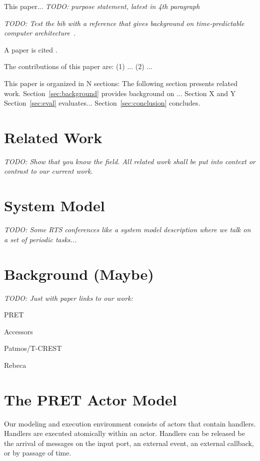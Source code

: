 \documentclass[a4paper, conference]{IEEEtran}
\newcommand{\todo}[1]{{\emph{TODO: #1}}}
\begin{document}
This paper... \todo{purpose statement, latest in 4th paragraph}

\todo{Test the bib with a reference that gives background on time-predictable
computer architecture~\cite{tpca:jes}.}

A paper is cited \cite{paper:example}.

The contributions of this paper are: (1) ... (2) ...

This paper is organized in N sections: The following section presents related work.
Section~\ref{sec:background} provides background on ...
Section X and Y 
Section~\ref{sec:eval} evaluates...
Section~\ref{sec:conclusion} concludes.

\section{Related Work}
\label{sec:related}

\todo{Show that you know the field. All related work shall be put
into context or contrast to our current work.}



\section{System Model}
\label{sec:sysmod}

\todo{Some RTS conferences like a system model description where we talk
on a set of periodic tasks...}

\section{Background (Maybe)}

\todo{Just with paper links to our work:}

PRET \cite{pret:dac2007} \cite{pret:cases:2008}

Accessors

Patmos/T-CREST \cite{patmos:rts2018} \cite{t-crest:2015}

Rebeca


\section{The PRET Actor Model}
\label{sec:actor}

Our modeling and execution environment consists of actors that contain
handlers. Handlers are executed atomically within an actor.
Handlers can be released be the arrival of messages on the input
port, an external event, an external callback, or by passage of time.
\end{document}
